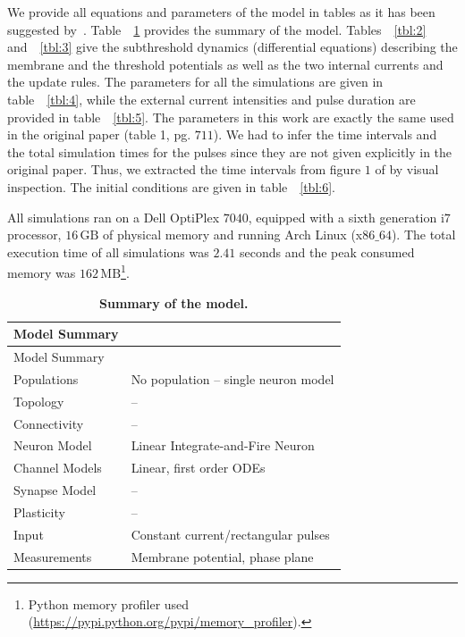 \documentclass[10pt,a4paper,onecolumn]{article}
\begin{document}
We provide all equations and parameters of the model in tables as it has
been suggested by~\autocite{nordlie:2009}. Table~~\ref{tbl:1} provides
the summary of the model. Tables~~\ref{tbl:2} and~~\ref{tbl:3} give the
subthreshold dynamics (differential equations) describing the membrane
and the threshold potentials as well as the two internal currents and
the update rules. The parameters for all the simulations are given in
table~~\ref{tbl:4}, while the external current intensities and pulse
duration are provided in table~~\ref{tbl:5}. The parameters in this work
are exactly the same used in the original paper (table 1, pg. \(711\)).
We had to infer the time intervals and the total simulation times for
the pulses since they are not given explicitly in the original paper.
Thus, we extracted the time intervals from figure \(1\) of
\autocite{mihalas:2009} by visual inspection. The initial conditions are
given in table~~\ref{tbl:6}.

All simulations ran on a Dell OptiPlex \(7040\), equipped with a sixth
generation i\(7\) processor, \(16\, \mathrm{GB}\) of physical memory and
running Arch Linux (x\(86\_64\)). The total execution time of all
simulations was \(2.41\) seconds and the peak consumed memory was
\(162\, {\mathrm{MB}}\)\footnote{Python memory profiler used
  (\url{https://pypi.python.org/pypi/memory_profiler}).}.

\hypertarget{tbl:1}{}
\begin{longtable}[]{@{}ll@{}}
\caption{\label{tbl:1}\textbf{Summary of the model.} }\tabularnewline
\toprule
Model Summary &\tabularnewline
\midrule
\endfirsthead
\toprule
Model Summary &\tabularnewline
\midrule
\endhead
Populations & No population -- single neuron model\tabularnewline
Topology & --\tabularnewline
Connectivity & --\tabularnewline
Neuron Model & Linear Integrate-and-Fire Neuron\tabularnewline
Channel Models & Linear, first order ODEs\tabularnewline
Synapse Model & --\tabularnewline
Plasticity & --\tabularnewline
Input & Constant current/rectangular pulses\tabularnewline
Measurements & Membrane potential, phase plane\tabularnewline
\bottomrule
\end{longtable}
\end{document}
